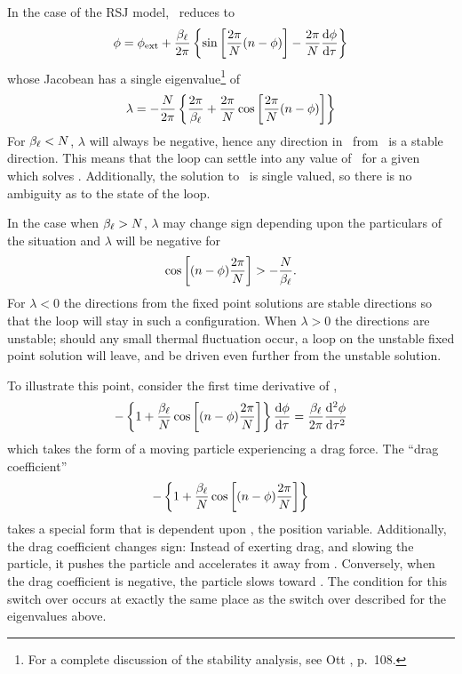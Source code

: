 %
%
\label{RSJ model!stability analysis}
In the case of the RSJ model, \ reduces to 
%
\begin{equation}
\label{eqn:ode_rsj}
\phi  = \phi_{\mathrm{ext}} + {\beta_\ell \over 2 \pi} \left\{
         \sin\left[{2 \pi \over N}( n - \phi)\right]
        - {2 \pi \over N} {\mathrm{d} \phi \over \mathrm{d} \tau} 
        \right\}
\end{equation}
%
whose Jacobean has a single eigenvalue\footnote{For a complete discussion
of the stability analysis, see Ott \cite{ott}, p.~108.}
 of 
%
\begin{equation}
\label{eqn:rsj_eigenvalue}
\lambda =- {N\over 2 \pi} \left\{{2\pi\over\beta_\ell} + 
          {2\pi\over N} \cos \left[{2\pi\over N} (n-\phi) \right] 
          \right\}
\end{equation}
%
For $\beta_\ell < N$, $\lambda$ will always be negative, hence any direction in 
\phitot\
from \ is a stable direction. This means that the loop
can settle into any value of \phitot\ for a given \phiext which 
solves \EqnRef{eqn:ode_rsj}. Additionally,
the solution to 
\
is single valued, so there is no ambiguity as to the state of the loop. 

In the case when $\beta_\ell > N$, $\lambda$ may change sign depending upon 
the particulars of the situation and $\lambda$ will be negative for 
%
\begin{equation}
\label{eqn:overdampedattracteigenvalue}
\cos\left[(n-\phi) {2 \pi \over N} \right] > -{N \over \beta_\ell}.
\end{equation}
%
For $\lambda < 0$ the directions from the fixed point solutions
are stable directions so that the loop will stay in such a configuration. 
When $\lambda > 0$ the directions are unstable;  should any small thermal
fluctuation occur, a loop on the unstable 
fixed point solution will leave, and be
driven even further from the unstable solution. 


To illustrate this point, consider the first time derivative of 
,
\begin{equation}
-\left\{1+{\beta_\ell\over N}\cos\left[(n-\phi){2\pi\over N}\right]\right\}
{\mathrm{d}\phi\over\mathrm{d}\tau} = {\beta_\ell\over 2\pi}{\mathrm{d}^2\phi\over\mathrm{d}\tau^2}
\end{equation}
which takes the form of a moving particle experiencing a drag force. 
The ``drag coefficient''
\begin{displaymath}
-\left\{1+{\beta_\ell\over N}\cos\left[(n-\phi){2\pi\over N}\right]\right\}
\end{displaymath}
takes a special form that is dependent upon \phitot, the position variable. 
Additionally,
the drag coefficient changes sign:  Instead of exerting drag, 
and slowing the particle, it pushes the particle and accelerates it 
away from \phitot. 
Conversely, when the drag 
coefficient is negative, the particle slows toward \phitot. The condition
for this switch over occurs at exactly the same place as the switch over
described for the eigenvalues above. 


